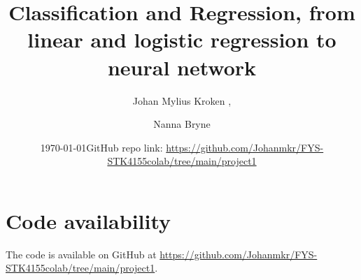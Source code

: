 






\title{Classification and Regression, from linear and logistic regression to neural network} 

\author{Johan Mylius Kroken
,
\and
Nanna Bryne
}
\date{\today    \quad GitHub repo link: \url{https://github.com/Johanmkr/FYS-STK4155colab/tree/main/project1}}  

\maketitle





%


\section*{Code availability}
The code is available on GitHub at \url{https://github.com/Johanmkr/FYS-STK4155colab/tree/main/project1}.





